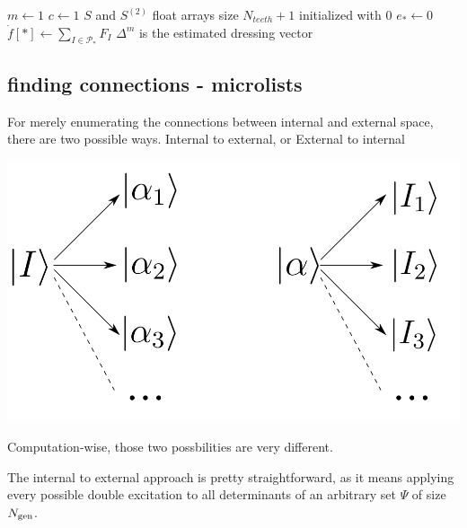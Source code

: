\documentclass[./thesis.tex]{subfiles}
\begin{document}
\begin{algorithm}
	$m \gets 1$ \;
	$c \gets 1$ \;
	$S$ and $S^{(2)}$ float arrays size $N_{teeth}+1$ initialized with $0$ \;
	$e_* \gets 0$ \;
	$\dot f[*] \gets \sum_{I \in \mathcal{P}_*} F_I$ \;
	$\Delta^m$ is the estimated dressing vector \;
	
\end{algorithm}

\subsection{finding connections - microlists}


For merely enumerating the connections between internal and external space, there are two possible ways.
Internal to external, or External to internal
	\begin{center}
		\includegraphics[width=0.5\columnwidth]{figures/matrix_dressing/interactions}
	\end{center}

Computation-wise, those two possbilities are very different.


The internal to external approach is pretty straightforward, as it means applying every possible double excitation to all determinants of an arbitrary set $\Psi$ of size ${N_\text{gen}}$. 
\end{document}
